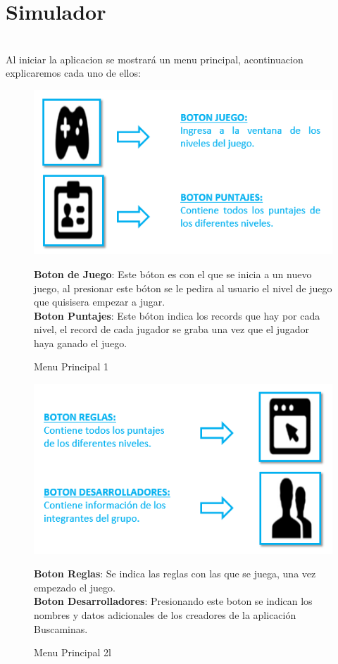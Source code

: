\section{Simulador}
\ \\ Al iniciar la aplicacion se mostrará un menu principal, acontinuacion explicaremos cada uno de ellos:\\

\begin{figure}[htbp]
\begin{center}
\includegraphics[width=.70\textwidth]{./imagenes/controles1.png}
\caption{Menu Principal 1}
\label{MenuPrincipal}
\end{center}
\textbf{Boton de Juego}: Este bóton es con el que se inicia a un nuevo juego, al presionar este bóton se le pedira al usuario el nivel de juego que quisisera empezar a jugar.\\
\textbf{Boton Puntajes}: Este bóton indica los records que hay por cada nivel, el record de cada jugador se graba una vez que el jugador haya ganado el juego.
\end{figure}

\begin{figure}[htbp]
\begin{center}
\includegraphics[width=.70\textwidth]{./imagenes/C.png}
\caption{Menu Principal 2l}
\label{MenuPrincipal}
\end{center}
\textbf{Boton Reglas}: Se indica las reglas con las que se juega, una vez empezado el juego.\\
\textbf{Boton Desarrolladores}: Presionando este boton se indican los nombres y datos adicionales de los creadores de la aplicación Buscaminas.\\
\end{figure}
\ \\ \ \\ \ \\ \ \\

